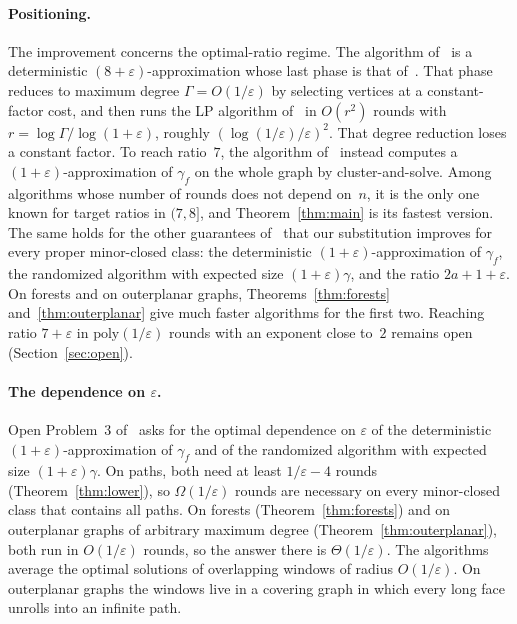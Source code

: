 \documentclass[11pt]{article}
\theoremstyle{remark}
\begin{document}
\paragraph{Positioning.} The improvement concerns the optimal-ratio regime. The algorithm
of~\cite{W26} is a deterministic $(8+\varepsilon)$-approximation whose last phase is that
of~\cite{HKOSV22}. That phase reduces to maximum degree $\Gamma=O(1/\varepsilon)$ by selecting
vertices at a constant-factor cost, and then runs the LP algorithm
of~\cite{KMW16} in $O(r^2)$ rounds with $r=\log\Gamma/\log(1+\varepsilon)$, roughly
$(\log(1/\varepsilon)/\varepsilon)^2$. That degree reduction loses a constant factor. To reach ratio~$7$,
the algorithm of~\cite{AS26} instead computes a $(1+\varepsilon)$-approximation of $\gamma_f$ on the
whole graph by cluster-and-solve. Among algorithms whose number of rounds does not depend on~$n$, it
is the only one known for target ratios in $(7,8]$, and Theorem~\ref{thm:main} is its fastest
version. The same holds for the other guarantees of~\cite[Thm.~6.2]{AS26} that our substitution
improves for every proper minor-closed class: the deterministic $(1+\varepsilon)$-approximation of
$\gamma_f$, the randomized algorithm with expected size $(1+\varepsilon)\gamma$, and the ratio
$2a+1+\varepsilon$. On forests and on outerplanar graphs, Theorems~\ref{thm:forests}
and~\ref{thm:outerplanar} give much faster algorithms for the first two. Reaching ratio $7+\varepsilon$ in
$\mathrm{poly}(1/\varepsilon)$ rounds with an exponent close to~$2$ remains open
(Section~\ref{sec:open}).

\paragraph{The dependence on $\varepsilon$.} Open Problem~3 of~\cite{AS26} asks for the optimal
dependence on $\varepsilon$ of the deterministic $(1+\varepsilon)$-approximation of $\gamma_f$ and of
the randomized algorithm with expected size $(1+\varepsilon)\gamma$. On paths, both need at least
$1/\varepsilon-4$ rounds (Theorem~\ref{thm:lower}), so $\Omega(1/\varepsilon)$ rounds are necessary
on every minor-closed class that contains all paths. On forests (Theorem~\ref{thm:forests}) and on
outerplanar graphs of arbitrary maximum degree (Theorem~\ref{thm:outerplanar}), both run in
$O(1/\varepsilon)$ rounds, so the answer there is $\Theta(1/\varepsilon)$. The algorithms average the
optimal solutions of overlapping windows of radius $O(1/\varepsilon)$. On outerplanar graphs the
windows live in a covering graph in which every long face unrolls into an infinite path.
\end{document}
